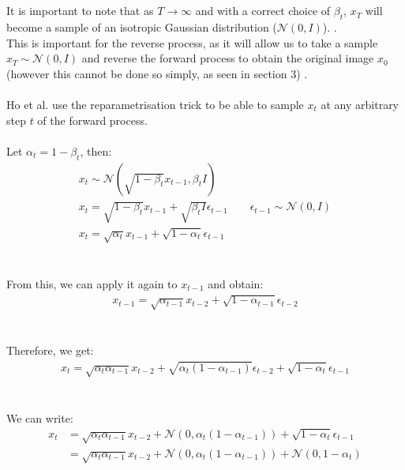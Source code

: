\documentclass{article}
\begin{document}
\\\\
It is important to note that as $T \rightarrow \infty$ and with a correct choice of $\beta_t$,  $x_T$ will become a sample of an isotropic Gaussian distribution ($\mathcal{N}\left(0, I\right)$). \cite{nichol2021improved} \cite{sohldickstein2015deep}. \\
This is important for the reverse process, as it will allow us to take a sample $x_T \sim \mathcal{N}\left(0, I\right)$ and reverse the forward process to obtain the original image $x_0$ (however this cannot be done so simply, as seen in section 3) \cite{nichol2021improved}.
\\\\
Ho et al. \cite{ho2020denoising} use the reparametrisation trick to be able to sample $x_t$ at any arbitrary step $t$ of the forward process.
\\\\
Let $\alpha_t = 1 - \beta_t$, then:
\begin{gather*}
  x_t \sim \mathcal{N}\left(\sqrt{1 - \beta_t} x_{t-1}, \beta_t I\right) \\
  x_t = \sqrt{1 - \beta_t} x_{t-1} + \sqrt{\beta_t I} \epsilon_{t-1} \qquad \epsilon_{t - 1} \sim \mathcal{N}\left(0, I\right) \\
  x_t = \sqrt{\alpha_t} x_{t-1} + \sqrt{1 - \alpha_t} \epsilon_{t - 1}
\end{gather*}
\\\\
From this, we can apply it again to $x_{t-1}$ and obtain:
\begin{gather*}
  x_{t-1} = \sqrt{\alpha_{t-1}} x_{t-2} + \sqrt{1 - \alpha_{t-1}} \epsilon_{t - 2}
\end{gather*}
\\\\
Therefore, we get:
\begin{gather*}
  x_t = \sqrt{\alpha_t \alpha_{t-1}} x_{t-2} + \sqrt{\alpha_t\left(1 - \alpha_{t-1}\right)} \epsilon_{t - 2} + \sqrt{1 - \alpha_t} \epsilon_{t - 1}
\end{gather*}
\\\\
We can write:
\begin{align}
  x_t &= \sqrt{\alpha_t \alpha_{t-1}} x_{t-2} + \mathcal{N}\left(0, \alpha_t\left(1 - \alpha_{t-1}\right)\right) + \sqrt{1 - \alpha_t} \epsilon_{t - 1} \\
&= \sqrt{\alpha_t \alpha_{t-1}} x_{t-2} + \mathcal{N}\left(0, \alpha_t\left(1 - \alpha_{t-1}\right)\right) + \mathcal{N}\left(0, 1 - \alpha_t\right)
\end{align}
\end{document}
